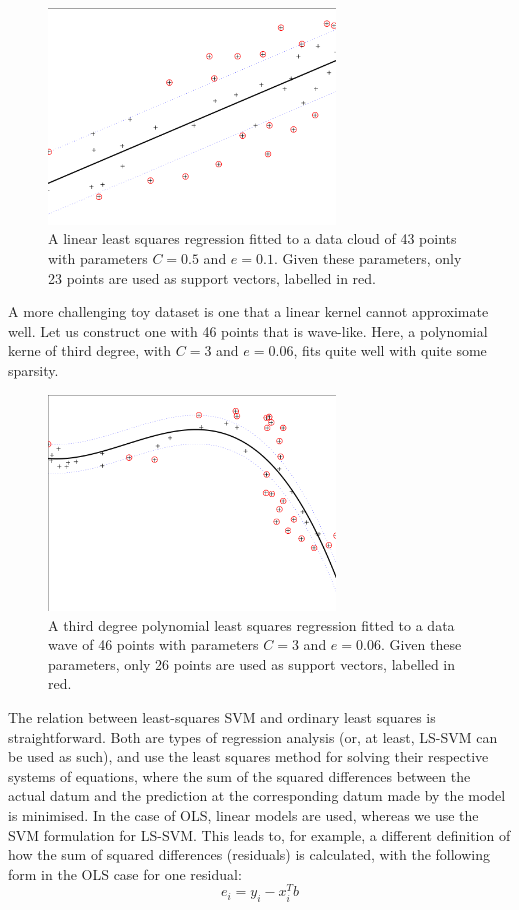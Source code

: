 \documentclass[10pt,a4paper]{article}
\begin{document}
\begin{figure}[h!]
\centering
  \includegraphics[width=3in]{uiregressFinal.png}
  \caption{A linear least squares regression fitted to a data cloud of 43 points with parameters $C=0.5$ and $e=0.1$. Given these parameters, only 23 points are used as support vectors, labelled in red.}
  \label{fig:uiregress}
\end{figure}

A more challenging toy dataset is one that a linear kernel cannot approximate well. Let us construct one with 46 points that is wave-like. Here, a polynomial kerne of third degree, with $C=3$ and $e=0.06$, fits quite well with quite some sparsity.

\begin{figure}[h!]
\centering
  \includegraphics[width=3in]{uiregressPoly.png}
  \caption{A third degree polynomial least squares regression fitted to a data wave of 46 points with parameters $C=3$ and $e=0.06$. Given these parameters, only 26 points are used as support vectors, labelled in red.}
  \label{fig:uiregressPoly}
\end{figure}

The relation between least-squares SVM and ordinary least squares is straightforward. Both are types of regression analysis (or, at least, LS-SVM can be used as such), and use the least squares method for solving their respective systems of equations, where the sum of the squared differences between the actual datum and the prediction at the corresponding datum made by the model is minimised. In the case of OLS, linear models are used, whereas we use the SVM formulation for LS-SVM. This leads to, for example, a different definition of how the sum of squared differences (residuals) is calculated, with the following form in the OLS case for one residual:
$$
e_i = y_i - x_i^T b
$$
\end{document}
